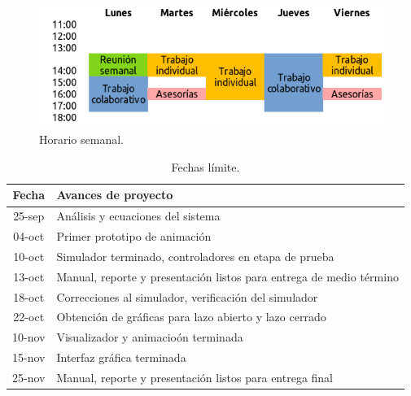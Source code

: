 \begin{figure}
 \centering
 \includegraphics[scale=0.6]{img/horario.png}
 \caption{Horario semanal.}
 \label{fig: horario}
\end{figure}

\begin{table}[h!]
\centering 
\begin{tabular}{c|l} 
\label{table: calendar} 
Fecha & Avances de proyecto\\ 
\hline 
25-sep & An\'alisis y ecuaciones del sistema\\
04-oct & Primer prototipo de animaci\'on\\
10-oct & Simulador terminado, controladores en etapa de 
prueba\\
13-oct & Manual, reporte y presentaci\'on listos para 
entrega de medio t\'ermino\\
18-oct & Correcciones al simulador, verificaci\'on del 
simulador\\
22-oct & Obtenci\'on de gr\'aficas para lazo abierto y 
lazo cerrado\\
10-nov & Visualizador y animacio\'on terminada\\
15-nov & Interfaz gr\'afica terminada\\
25-nov & Manual, reporte y presentaci\'on listos para 
entrega final\\

\hline 
\end{tabular} 
\caption{Fechas l\'imite.} 
\end{table}
